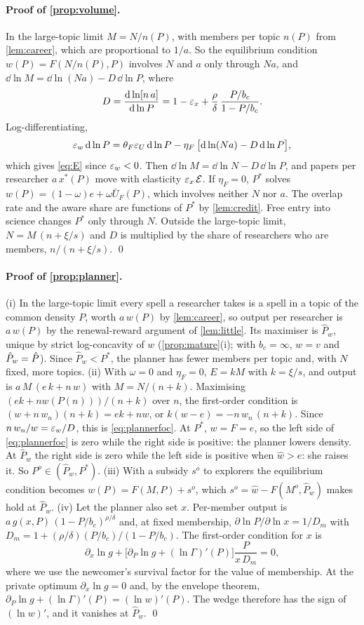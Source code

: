 \paragraph{Proof of \cref{prop:volume}.} In the large-topic limit $M=N/n(P)$,
with members per topic $n(P)$ from \cref{lem:career}, which are proportional to
$1/a$. So the equilibrium condition $w(P)=F(N/n(P),P)$ involves $N$ and $a$
only through $Na$, and
$\dd\ln M=\dd\ln(Na)-D\,\dd\ln P$, where
\[
D=\frac{\mathrm{d}\ln[n\,a]}{\mathrm{d}\ln P}=1-\varepsilon_x+\frac\rho\delta\,\frac{P/b_c}{1-P/b_c}.
\]
Log-differentiating,
\[
\varepsilon_w\,\mathrm{d}\ln P=\theta_F\varepsilon_U\,\mathrm{d}\ln P-\eta_F\,\big[\mathrm{d}\ln(Na)-D\,\mathrm{d}\ln P\big],
\]
which gives \eqref{eq:E} since $\varepsilon_w<0$. Then $\dd\ln M=\dd\ln N-D\,\dd\ln P$,
and papers per researcher $a\,x^*(P)$ move with elasticity $\varepsilon_x\,\mathcal E$. If
$\eta_F=0$, $P^*$ solves $w(P)=(1-\omega)e+\omega\bar U_F(P)$, which involves
neither $N$ nor $a$. The overlap rate and the aware share are functions of $P^*$
by \cref{lem:credit}. Free entry into science changes $P^*$ only through $N$.
Outside the large-topic limit, $N=M\,(n+\xi/s)$ and $D$ is multiplied by the
share of researchers who are members, $n/(n+\xi/s)$. \qed

\paragraph{Proof of \cref{prop:planner}.} (i) In the large-topic limit every
spell a researcher takes is a spell in a topic of the common density $P$,
worth $a\,w(P)$ by \cref{lem:career}, so output per researcher is $a\,w(P)$ by
the renewal-reward argument of \cref{lem:little}. Its maximiser is $\hat P_w$,
unique by strict log-concavity of $w$ (\cref{prop:mature}(i); with $b_c=\infty$,
$w=v$ and $\hat P_w=\hat P$). Since $\hat P_w<P^*$, the planner has fewer members
per topic and, with $N$ fixed, more topics. (ii) With $\omega=0$ and $\eta_F=0$,
$E=kM$ with $k=\xi/s$, and output is $a\,M\,(e\,k+n\,w)$ with $M=N/(n+k)$.
Maximising $(ek+nw(P(n)))/(n+k)$ over $n$, the first-order condition is
$(w+n\,w_n)(n+k)=ek+nw$, or $k(w-e)=-n\,w_n\,(n+k)$. Since
$n\,w_n/w=\varepsilon_w/D$, this is \eqref{eq:plannerfoc}. At $P^*$, $w=F=e$, so the
left side of \eqref{eq:plannerfoc} is zero while the right side is positive:
the planner lowers density. At $\hat P_w$ the right side is zero while the left
side is positive when $\hat w>e$: she raises it. So $P^o\in(\hat P_w,P^*)$.
(iii) With a subsidy $s^o$ to explorers the equilibrium condition becomes
$w(P)=F(M,P)+s^o$, which $s^o=\hat w-F(M^o,\hat P_w)$ makes hold at $\hat P_w$.
(iv) Let the planner also set $x$. Per-member output is
$a\,g(x,P)\,(1-P/b_c)^{\rho/\delta}$ and, at fixed membership,
$\partial\ln P/\partial\ln x=1/D_m$ with
$D_m=1+(\rho/\delta)(P/b_c)/(1-P/b_c)$. The first-order condition for $x$ is
\[
\partial_x\ln g+\big[\partial_P\ln g+(\ln\Gamma)'(P)\big]\frac{P}{x\,D_m}=0,
\]
where we use the newcomer's survival factor for the value of membership. At the
private optimum $\partial_x\ln g=0$ and, by the envelope theorem,
$\partial_P\ln g+(\ln\Gamma)'(P)=(\ln w)'(P)$. The wedge therefore has the sign
of $(\ln w)'$, and it vanishes at $\hat P_w$. \qed

